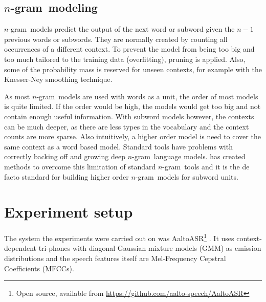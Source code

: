 \documentclass[b5paper]{article}
\newcommand{\note}[1]{{\textcolor{blue}{#1}}}
\newcommand{\ngram}{$n$-gram}
\begin{document}
\subsection{\ngram\ modeling}

\ngram\ models predict the output of the next word or subword given the $n-1$ previous words or subwords. They are normally created by counting all occurrences of a different context. To prevent the model from being too big and too much tailored to the training data (overfitting), pruning is applied. Also, some of the probability mass is reserved for unseen contexts, for example with the Knesser-Ney smoothing technique\cite{chen1996empirical}.

As most \ngram\ models are used with words as a unit, the order of most models is quite limited. If the order would be high, the models would get too big and not contain enough useful information. With subword models however, the contexts can be much deeper, as there are less types in the vocabulary and the context counts are more sparse. Also intuitively, a higher order model is need to cover the same context as a word based model.
Standard tools have problems with correctly backing off and growing deep \ngram\ language models.  \cite{siivola2007growing} has created methods to overcome this limitation of standard \ngram\ tools and it is the de facto standard for building higher order \ngram\ models for subword units.



\section{Experiment setup}



The system the experiments were carried out on was AaltoASR\footnote{Open source, available from \url{https://github.com/aalto-speech/AaltoASR}} \cite{hirsimaki2009importance}\cite{pylkkonen2005efficient}. It uses context-dependent tri-phones with diagonal Gaussian mixture models (GMM) as emission distributions and the speech features itself are Mel-Frequency Cepstral Coefficients (MFCCs). 
\end{document}
